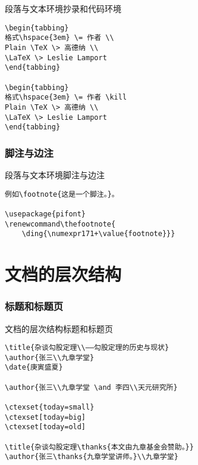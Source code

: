 \documentclass[11pt]{beamer}
\begin{document}
\begin{frame}[fragile]{段落与文本环境}{抄录和代码环境}
	\begin{Verbatim}[tabsize=2]
\begin{tabbing}
格式\hspace{3em} \= 作者 \\
Plain \TeX \> 高德纳 \\
\LaTeX \> Leslie Lamport
\end{tabbing}

\begin{tabbing}
格式\hspace{3em} \= 作者 \kill
Plain \TeX \> 高德纳 \\
\LaTeX \> Leslie Lamport
\end{tabbing}
	\end{Verbatim}
\end{frame}

\section{脚注与边注}

\begin{frame}[fragile]{段落与文本环境}{脚注与边注}
	\begin{Verbatim}[tabsize=2]
例如\footnote{这是一个脚注。}。

\usepackage{pifont}
\renewcommand\thefootnote{
	\ding{\numexpr171+\value{footnote}}}
	\end{Verbatim}
\end{frame}

\part{文档的层次结构}

\section{标题和标题页}

\begin{frame}[fragile]{文档的层次结构}{标题和标题页}
	\begin{Verbatim}[tabsize=2]
\title{杂谈勾股定理\\——勾股定理的历史与现状}
\author{张三\\九章学堂}
\date{庚寅盛夏}

\author{张三\\九章学堂 \and 李四\\天元研究所}

\ctexset{today=small}
\ctexset[today=big]
\ctexset[today=old]

\title{杂谈勾股定理\thanks{本文由九章基金会赞助。}}
\author{张三\thanks{九章学堂讲师。}\\九章学堂}
	\end{Verbatim}
\end{frame}
\end{document}
